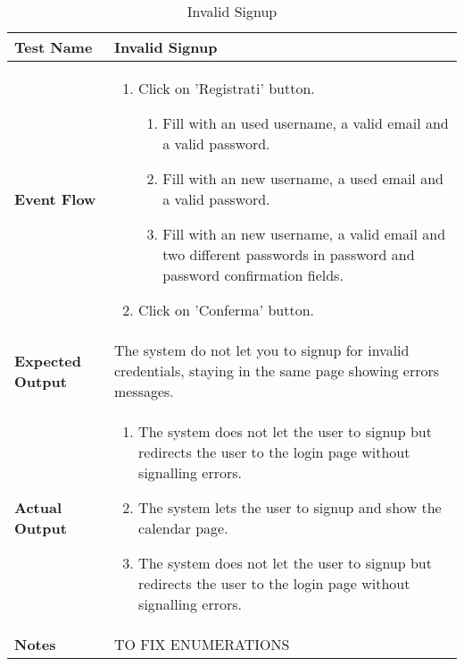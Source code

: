 \begin{table}[h]	
	\centering
	\def\arraystretch{1.5}
	\begin{tabular}{|m{7cm}|m{7cm}|}
		\hline
		\textbf{Test Name}            &  Invalid Signup  \\ \hline
		\textbf{Event Flow}             &  
		\begin{enumerate}
			\item Click on 'Registrati' button.
			\begin{enumerate}
				\item Fill with an used username, a valid email and a valid password.
				\item Fill with an new username, a used email and a valid password.
				\item Fill with an new username, a valid email and two different passwords in password and password confirmation fields.
			\end{enumerate}
		\item Click on 'Conferma' button.
		\end{enumerate} \\ \hline
		\textbf{Expected Output}  &  The system do not let you to signup for invalid credentials, staying in the same page showing errors messages.   \\ \hline
		\textbf{Actual Output}       & 
		\begin{enumerate}[label=\Alph*]
			\item The system does not let the user to signup but redirects the user to the login page without signalling errors.
			\item The system lets the user to signup and show the calendar page.
			\item The system does not let the user to signup but redirects the user to the login page without signalling errors.
		\end{enumerate}    \\ \hline
		\textbf{Notes} &  TO FIX ENUMERATIONS \\ \hline
	\end{tabular}
	\caption{Invalid Signup}
\end{table}


